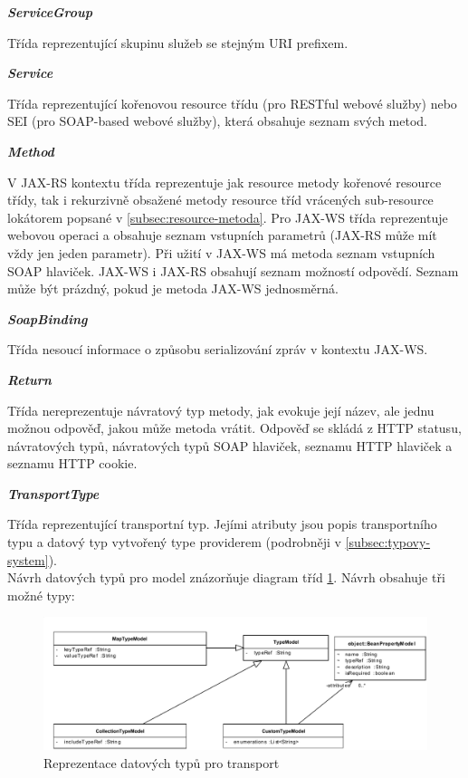 \documentclass[11pt,twoside,a4paper]{book}
\begin{document}
\textbf{\textit{ServiceGroup}}

Třída reprezentující skupinu služeb se stejným URI prefixem.

\textbf{\textit{Service}}

Třída reprezentující kořenovou resource třídu (pro RESTful webové služby) nebo
SEI (pro SOAP-based webové služby), která obsahuje seznam svých metod.

\textbf{\textit{Method}}

V JAX-RS kontextu třída reprezentuje jak resource metody kořenové resource
třídy, tak i rekurzivně obsažené metody resource tříd vrácených sub-resource
lokátorem popsané v \ref{subsec:resource-metoda}.
Pro JAX-WS třída reprezentuje webovou operaci a obsahuje seznam vstupních
parametrů (JAX-RS může mít vždy jen jeden parametr). Při užití v JAX-WS má
metoda seznam vstupních SOAP hlaviček. JAX-WS i JAX-RS obsahují seznam možností
odpovědí.
Seznam může být prázdný, pokud je metoda JAX-WS jednosměrná.

\textbf{\textit{SoapBinding}}

Třída nesoucí informace o způsobu serializování zpráv v kontextu JAX-WS.

\textbf{\textit{Return}}

Třída nereprezentuje návratový typ metody, jak evokuje její název, ale jednu
možnou odpověď, jakou může metoda vrátit. Odpověď se skládá z HTTP statusu, návratových typů,
návratových typů SOAP hlaviček, seznamu HTTP hlaviček a seznamu HTTP cookie.

\textbf{\textit{TransportType}}

Třída reprezentující transportní typ. Jejími atributy jsou popis transportního
typu a datový typ vytvořený type providerem (podrobněji v
\ref{subsec:typovy-system}).
\mbox{}\\
Návrh datových typů pro model znázorňuje diagram tříd \ref{fig:typovy-system}.
Návrh obsahuje tři možné typy:

\begin{figure}[h]
\begin{center}
\includegraphics[width=13cm]{images-pdf/TypeSystem.pdf}
\caption{Reprezentace datových typů pro transport}
\label{fig:typovy-system}
\end{center}
\end{figure}
\end{document}
